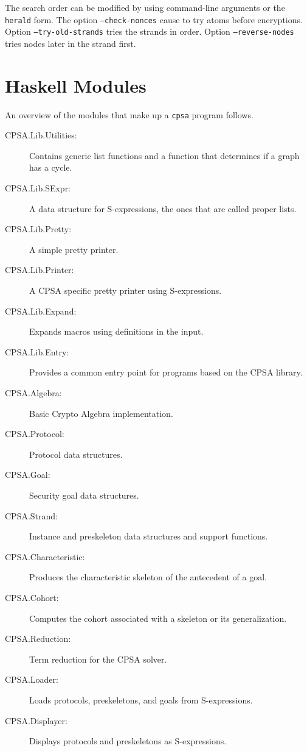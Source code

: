 \documentclass[12pt]{report}
\theoremstyle{definition}
\begin{document}
\enlargethispage{\baselineskip}
The search order can be modified by using command-line arguments or
the \texttt{herald} form.  The option \texttt{--check-nonces} cause
{\cpsa} to try atoms before encryptions.  Option
\texttt{--try-old-strands} tries the strands in order.  Option
\texttt{--reverse-nodes} tries nodes later in the strand first.

\chapter{Haskell Modules}\label{cha:haskell modules}

An overview of the modules that make up a \texttt{cpsa} program
follows.

\begin{description}
\item[CPSA.Lib.Utilities:]
Contains generic list functions and a function that determines if a
graph has a cycle.
\item[CPSA.Lib.SExpr:]
A data structure for S-expressions, the ones that are called
proper lists.
\item[CPSA.Lib.Pretty:]
A simple pretty printer.
\item[CPSA.Lib.Printer:]
A CPSA specific pretty printer using S-expressions.
\item[CPSA.Lib.Expand:]
Expands macros using definitions in the input.
\item[CPSA.Lib.Entry:]
Provides a common entry point for programs based on the CPSA library.
\item[CPSA.Algebra:]
Basic Crypto Algebra implementation.
\item[CPSA.Protocol:]
Protocol data structures.
\item[CPSA.Goal:]
Security goal data structures.
\item[CPSA.Strand:]
Instance and preskeleton data structures and support functions.
\item[CPSA.Characteristic:]
Produces the characteristic skeleton of the antecedent of a goal.
\item[CPSA.Cohort:]
Computes the cohort associated with a skeleton or its generalization.
\item[CPSA.Reduction:]
Term reduction for the CPSA solver.
\item[CPSA.Loader:]
Loads protocols, preskeletons, and goals from S-expressions.
\item[CPSA.Displayer:]
Displays protocols and preskeletons as S-expressions.
\end{description}
\end{document}
